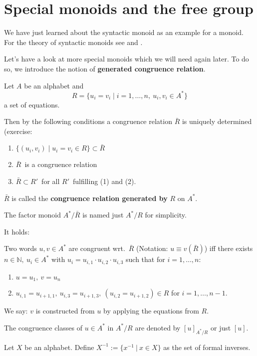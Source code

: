 \section{Special monoids and the free group}

We have just learned about the syntactic monoid as an example for a monoid. For
the theory of syntactic monoids see \cite{Salomaa} and \cite{Perrot}.

Let's have a look at more special monoids which we will need again later. To do
so, we introduce the notion of {\bf generated congruence relation}.

Let $A$ be an alphabet and
\[ R = \{ u_i = v_i \mid i = 1, \ldots, n,\ u_i, v_i \in A^* \} \] 
a set of equations.

Then by the following conditions a congruence relation $\bar{R}$ is uniquely
determined (exercise:
\begin{enumerate}
  \item $\{ (u_i, v_i) \mid u_i = v_i \in R \} \subset \bar{R}$
  \item $\bar{R}$\ is a congruence relation
  \item $\bar{R} \subset R'$\ for all $R'$\ fulfilling (1) and (2).
\end{enumerate}

$\bar{R}$ is called the {\bf congruence relation generated by} $R$ on $A^*$.

The factor monoid $A^*/\bar{R}$ is named just $A^*/R$ for simplicity.

It holds: 

Two words $u, v \in A^*$ are congruent wrt.\ $\bar{R}$ (Notation: $u
\equiv v (\bar{R})$) iff there exists $n \in \mathbb{N},\ u_i \in A^*$ with $u_i
= u_{i,1} \cdot u_{i,2} \cdot u_{i,3}$ such that for $i = 1, \ldots, n$:
\begin{enumerate}
  \item $u = u_1,\ v = u_n$
  \item $u_{i,1} = u_{i+1,1},\ u_{i,3} = u_{i+1,3},\ (u_{i,2} = u_{i+1,2}) \in
  R$ for $i = 1, \ldots, n-1$.
\end{enumerate}

We say: $v$ is constructed from $u$ by applying the equations from $R$.

The congruence classes of $u \in A^*$ in $A^* / R$ are denoted by $[u]_{A^*/R}$
or just $[u]$.

\begin{definition}
Let $X$ be an alphabet. Define $X^{-1} := \{ x^{-1}\ |\ x \in X \}$ as the set
of formal inverses.
\end{definition}

